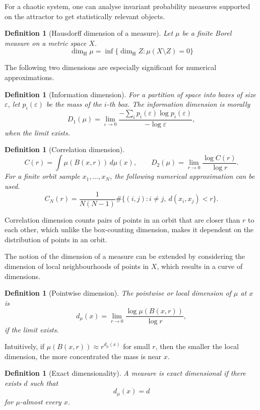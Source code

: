 \documentclass[11pt,a4paper]{article}
\newtheorem{definition}[theorem]{Definition}
\newcommand{\eps}{\varepsilon}
\newcommand{\dimH}{\dim_{\mathrm H}}
\begin{document}
For a chaotic system, one can analyse invariant probability measures supported on the attractor to get statistically relevant objects.

\begin{definition}[Hausdorff dimension of a measure]
	Let \(\mu\) be a finite Borel measure on a metric space \(X\).
	\[
		\dimH \mu
		= \inf\{\dimH Z: \mu(X\setminus Z)=0\}
	\]
\end{definition}

The following two dimensions are especially significant for numerical approximations.

\begin{definition}[Information dimension]
	For a partition of space into boxes of size \(\eps\), let \(p_i(\eps)\) be the mass of the \(i\)-th box. The information dimension is morally
	\[
		D_1(\mu)
		= \lim_{\eps\to0}
		\frac{-\sum_i p_i(\eps)\log p_i(\eps)}{-\log \eps},
	\]
	when the limit exists.
\end{definition}

\begin{definition}[Correlation dimension]
	\[
		C(r) = \int \mu(B(x,r))\,d\mu(x),
		\qquad
		D_2(\mu)=\lim_{r\to 0}\frac{\log C(r)}{\log r}.
	\]
	\noindent For a finite orbit sample \(x_1,\dots,x_N\), the following numerical approximation can be used.
	\[
		C_N(r)=\frac{1}{N(N-1)}\#\{(i,j):i\neq j,\ d(x_i,x_j)<r\}.
	\]
\end{definition}
\noindent Correlation dimension counts pairs of points in an orbit that are closer than \(r\) to each other, which unlike the box-counting dimension, makes it dependent on the distribution of points in an orbit.

The notion of the dimension of a measure can be extended by considering the dimension of local neighbourhoods of points in \(X\), which results in a curve of dimensions.
\begin{definition}[Pointwise dimension]
	The pointwise or local dimension of \(\mu\) at \(x\) is
	\[
		d_\mu(x)
		= \lim_{r\to 0}\frac{\log \mu(B(x,r))}{\log r},
	\]
	if the limit exists.
\end{definition}
\noindent Intuitively, if \(\mu(B(x,r)) \approx r^{d_\mu(x)}\) for small \(r\), then the smaller the local dimension, the more concentrated the mass is near \(x\).
\begin{definition}[Exact dimensionality]
	A measure is exact dimensional if there exists \(d\) such that
	\[
		d_\mu(x)=d
	\]
	for \(\mu\)-almost every \(x\).
\end{definition}
\end{document}
